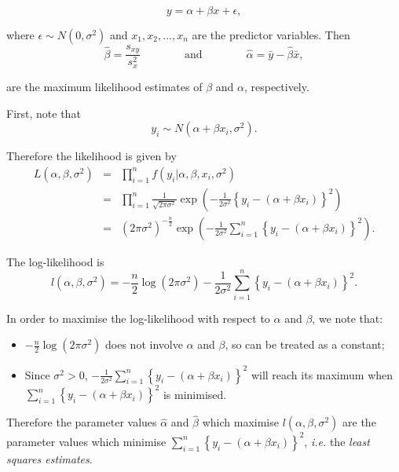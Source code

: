 \documentclass[
]{book}
\providecommand{\tightlist}{%
  \setlength{\itemsep}{0pt}\setlength{\parskip}{0pt}}
\begin{document}
\[ y= \alpha + \beta x + \epsilon, \]

where \(\epsilon \sim N(0,\sigma^2)\) and \(x_1,x_2, \ldots, x_n\) are the predictor variables. Then\\

\[  \hat{\beta} = \frac{s_{xy}}{s_x^2} \qquad \qquad \mbox{and} \qquad \qquad \hat{\alpha} =  \bar{y} - \hat{\beta}\bar{x}, \]

are the maximum likelihood estimates of \(\beta\) and \(\alpha\), respectively.

\hypertarget{Sec_LinearI:prf:MLE}{}
First, note that\\

\[ y_i \sim N (\alpha + \beta x_i, \sigma^2). \]

Therefore the likelihood is given by\\

\begin{eqnarray*}  L (\alpha,\beta, \sigma^2) &=& \prod_{i=1}^n f(y_i | \alpha, \beta, x_i, \sigma^2) \\
&=& \prod_{i=1}^n \frac{1}{\sqrt{2 \pi \sigma^2}} \exp \left( - \frac{1}{2 \sigma^2} \left\{ y_i - (\alpha +\beta x_i) \right\}^2 \right) \\
&=& (2 \pi \sigma^2)^{-\frac{n}{2}} \exp \left( -\frac{1}{2 \sigma^2} \sum_{i=1}^n \left\{ y_i - (\alpha +\beta x_i) \right\}^2 \right).
\end{eqnarray*}

The log-likelihood is\\

\[ l (\alpha,\beta, \sigma^2) = - \frac{n}{2} \log \left(2 \pi \sigma^2 \right) -\frac{1}{2 \sigma^2} \sum_{i=1}^n \left\{ y_i - (\alpha +\beta x_i) \right\}^2. \]

In order to maximise the log-likelihood with respect to \(\alpha\) and \(\beta\), we note that:

\begin{itemize}
\tightlist
\item
  \(- \frac{n}{2} \log \left(2 \pi \sigma^2 \right)\) does not involve \(\alpha\) and \(\beta\), so can be treated as a constant;\\
\item
  Since \(\sigma^2 >0\), \(-\frac{1}{2 \sigma^2} \sum_{i=1}^n \left\{ y_i - (\alpha +\beta x_i) \right\}^2\) will reach its maximum when \(\sum_{i=1}^n \left\{ y_i - (\alpha +\beta x_i) \right\}^2\) is minimised.
\end{itemize}

Therefore the parameter values \(\hat{\alpha}\) and \(\hat{\beta}\) which maximise \(l (\alpha,\beta, \sigma^2)\) are the parameter values which minimise \(\sum_{i=1}^n \left\{ y_i - (\alpha +\beta x_i) \right\}^2\), \emph{i.e.} the \emph{least squares estimates}.
\end{document}
